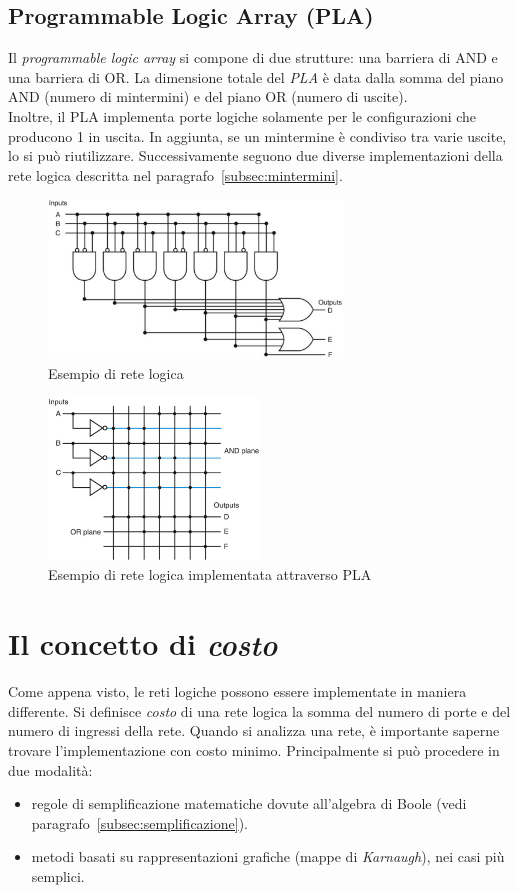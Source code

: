 \documentclass[class=book, crop=false, oneside]{standalone}
\begin{document}
\subsection*{Programmable Logic Array (PLA)}
\label{subsec:pla}
Il \emph{programmable logic array} si compone di due strutture: una barriera di AND e una barriera di OR. La dimensione totale del \emph{PLA} è data dalla somma del piano AND (numero di mintermini) e del piano OR (numero di uscite).\\
Inoltre, il PLA implementa porte logiche solamente per le configurazioni che producono 1 in uscita. In aggiunta, se un mintermine è condiviso tra varie uscite, lo si può riutilizzare.
Successivamente seguono due diverse implementazioni della rete logica descritta nel paragrafo~\ref{subsec:mintermini}.
\begin{figure}[H]
	\centering
	\includegraphics[width=0.7\textwidth,keepaspectratio]{es_rete_logica.png}
	\caption{Esempio di rete logica}
\end{figure}
\begin{figure}[H]
	\centering
	\includegraphics[width=0.5\textwidth,keepaspectratio]{es_pla.png}
	\caption{Esempio di rete logica implementata attraverso PLA}
\end{figure}

\section{Il concetto di \emph{costo}}
Come appena visto, le reti logiche possono essere implementate in maniera differente. Si definisce \emph{costo} di una rete logica la somma del numero di porte e del numero di ingressi della rete. Quando si analizza una rete, è importante saperne trovare l'implementazione con costo minimo. Principalmente si può procedere in due modalità:
\begin{itemize}[noitemsep]
	\item regole di semplificazione matematiche dovute all'algebra di Boole (vedi paragrafo~\ref{subsec:semplificazione}).
	\item metodi basati su rappresentazioni grafiche (mappe di \emph{Karnaugh}), nei casi più semplici.
\end{itemize}
\end{document}
